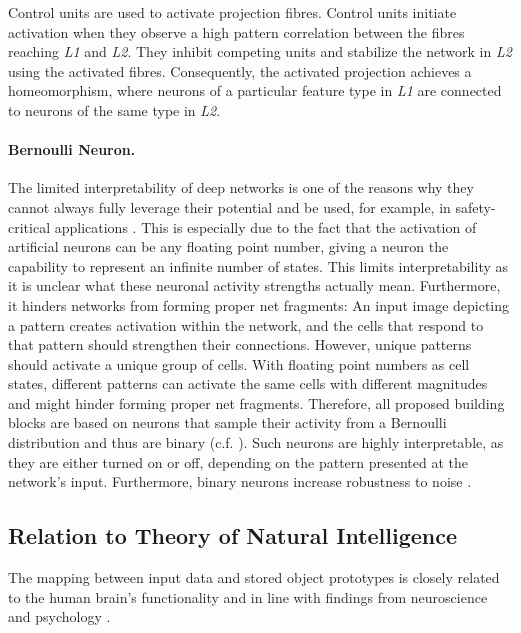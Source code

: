 Control units are used to activate projection fibres.
Control units initiate activation when they observe a high pattern correlation between the fibres reaching \emph{L1} and \emph{L2}. They inhibit competing units and stabilize the network in \emph{L2} using the activated fibres. Consequently, the activated projection achieves a homeomorphism, where neurons of a particular feature type in \emph{L1} are connected to neurons of the same type in \emph{L2}.


\paragraph{Bernoulli Neuron.} The limited interpretability of deep networks is one of the reasons why they cannot always fully leverage their potential and be used, for example, in safety-critical applications .
This is especially due to the fact that the activation of artificial neurons can be any floating point number, giving a neuron the capability to represent an infinite number of states. This limits interpretability as it is unclear what these neuronal activity strengths actually mean.
Furthermore, it hinders networks from forming proper net fragments: An input image depicting a pattern creates activation within the network, and the cells that respond to that pattern should strengthen their connections. However, unique patterns should activate a unique group of cells. With floating point numbers as cell states, different patterns can activate the same cells with different magnitudes and might hinder forming proper net fragments.
Therefore, all proposed building blocks are based on neurons that sample their activity from a Bernoulli distribution and thus are binary (c.f. ).
Such neurons are highly interpretable, as they are either turned on or off, depending on the pattern presented at the network's input.
Furthermore, binary neurons increase robustness to noise .


\subsection{Relation to Theory of Natural Intelligence}
The mapping between input data and stored object prototypes is closely related to the human brain's functionality and in line with findings from neuroscience \cite{kandel_principles_2013, olshausen_emergence_1996, vogels_inhibitory_2011, payeur_burst-dependent_2021} and psychology \cite{ellis_source_1938, kohler_gestalt_1992, wagemans_century_2012, hamlyn_psychology_2017}.

